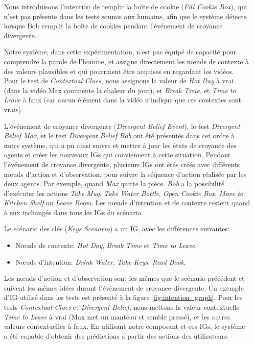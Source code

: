 \documentclass[a4paper,11pt,twoside]{StyleThese}
\begin{document}
Nous introduisons l'intention de remplir la boîte de cookie (\textit{Fill Cookie Box}), qui n'est pas présente dans les tests soumis aux humains, afin que le système détecte lorsque Bob remplit la boîte de cookies pendant l'événement de croyance divergente.

Notre système, dans cette expérimentation, n'est pas équipé de capacité pour comprendre la parole de l'homme, et assigne directement les nœuds de contexte à des valeurs plausibles et qui pourraient être acquises en regardant les vidéos. Pour le test de \textit{Contextual Clues}, nous assignons la valeur de \textit{Hot Day} à vrai (dans la vidéo Max commente la chaleur du jour), et \textit{Break Time}, et \textit{Time to Leave} à faux (car aucun élément dans la vidéo n'indique que ces contextes sont vrais).


L'événement de croyance divergente (\textit{Divergent Belief Event}), le test \textit{Divergent Belief Max}, et le test \textit{Divergent Belief Bob} ont été présentés dans cet ordre à notre système, qui a pu ainsi suivre et mettre à jour les états de croyance des agents et créer les nouveaux IGs qui conviennent à cette situation. Pendant l'événement de croyance divergente, plusieurs IGs ont étés créés avec différents nœuds d'action et d'observation, pour suivre la séquence d'action réalisée par les deux agents. Par exemple, quand \textit{Max} quitte la pièce, \textit{Bob} a la possibilité d'exécuter les actions \textit{Take Mug}, \textit{Take Water Bottle}, \textit{Open Cookie Box}, \textit{Move to Kitchen Shelf} ou \textit{Leave Room}. Les nœuds d'intention et de contexte restent quand à eux inchangés dans tous les IGs du scénario.


Le scénario des clés (\textit{Keys Scenario}) a un IG, avec les différences suivantes:
\begin{itemize}
\item Nœuds de contexte: \textit{Hot Day}, \textit{Break Time} et \textit{Time to Leave}.
\item Nœuds d'intention: \textit{Drink Water}, \textit{Take Keys}, \textit{Read Book}.
\end{itemize}

Les nœuds d'action et d'observation sont les mêmes que le scénario précédent et suivent les mêmes idées durant l'événement de croyance divergente. Un exemple d'IG utilisé dans les tests est présenté à la figure \ref{fig:intention_graph}. Pour les tests \textit{Contextual Clues} et \textit{Divergent Belief}, nous mettons la valeur contextuelle \textit{Time to Leave} à vrai (Max met un manteau et semble pressé), et les autres valeurs contextuelles à faux. En utilisant notre composant  et ces IGs, le système a été capable d'obtenir des prédictions à partir des actions des utilisateurs.
\end{document}
